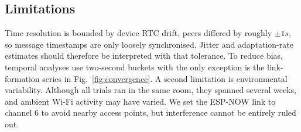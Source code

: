 \documentclass[conference]{IEEEtran}
\begin{document}


\subsection{Limitations}

Time resolution is bounded by device RTC drift, peers differed by roughly $\pm1s$, so message timestamps are only loosely synchronised. Jitter and adaptation-rate estimates should therefore be interpreted with that tolerance. To reduce bias, temporal analyses use two-second buckets with the only exception is the link-formation series in Fig.~\ref{fig:convergence}.
A second limitation is environmental variability. Although all trials ran in the same room, they spanned several weeks, and ambient Wi-Fi activity may have varied. We set the ESP-NOW link to channel 6 to avoid nearby access points, but interference cannot be entirely ruled out.

\end{document}
